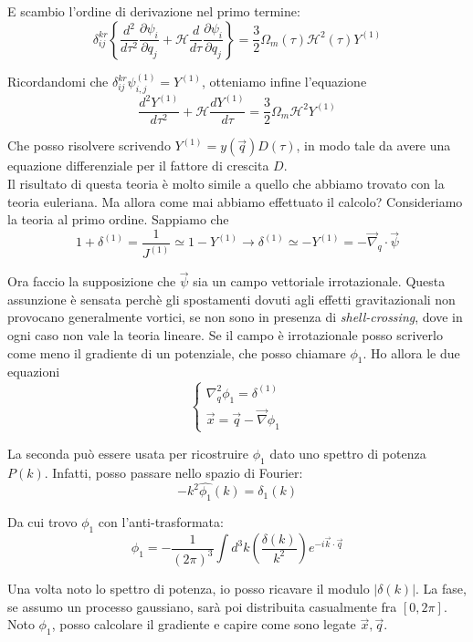 \documentclass{report}
\begin{document}
E scambio l'ordine di derivazione nel primo termine: 
\begin{equation}
    \delta^{kr}_{ij}\left\{\frac{d^2 }{d\tau^2}\frac{\partial \psi_i}{\partial q_j}  + \mathcal{H}\frac{d}{d\tau}\frac{\partial \psi_i}{\partial q_j}\right\} = \frac{3}{2}\Omega_m(\tau)\mathcal{H}^2(\tau)Y^{(1)}
\end{equation}

Ricordandomi che $\delta^{kr}_{ij}\psi^{(1)}_{i,j} = Y^{(1)}$, otteniamo infine l'equazione
\begin{equation}
    \frac{d^2 Y^{(1)}}{d\tau^2} + \mathcal{H}\frac{dY^{(1)}}{d\tau} = \frac{3}{2}\Omega_m \mathcal{H}^2 Y^{(1)}
\end{equation}

Che posso risolvere scrivendo $Y^{(1)} = y(\vec{q})D(\tau)$, in modo tale da avere una equazione differenziale per il fattore di crescita $D$. \\

Il risultato di questa teoria è molto simile a quello che abbiamo trovato con la teoria euleriana. Ma allora come mai abbiamo effettuato il calcolo? Consideriamo la teoria al primo ordine. Sappiamo che 
\begin{equation}
    1 + \delta^{(1)} = \frac{1}{J^{(1)}} \simeq 1 - Y^{(1)} \rightarrow \delta^{(1)} \simeq - Y^{(1)} = - \vec{\nabla}_q \cdot \vec{\psi}
\end{equation}

Ora faccio la supposizione che $\vec{\psi}$ sia un campo vettoriale irrotazionale. Questa assunzione è sensata perchè gli spostamenti dovuti agli effetti gravitazionali non provocano generalmente vortici, se non sono in presenza di \emph{shell-crossing}, dove in ogni caso non vale la teoria lineare. Se il campo è irrotazionale posso scriverlo come meno il gradiente di un potenziale, che posso chiamare $\phi_1$. Ho allora le due equazioni
\[\begin{cases}
    \nabla^2_q \phi_1 = \delta^{(1)} \\ \vec{x} = \vec{q} - \vec{\nabla}\phi_1
\end{cases}\]

La seconda può essere usata per ricostruire $\phi_1$ dato uno spettro di potenza $P(k)$. Infatti, posso passare nello spazio di Fourier: 
\begin{equation}
    -k^2\hat{\phi_1}(k) = \delta_1(k) 
\end{equation}

Da cui trovo $\phi_1$ con l'anti-trasformata: 
\begin{equation}
    \phi_1 = -\frac{1}{(2\pi)^3}\int d^3k \left(\frac{\delta(k)}{k^2}\right)e^{-i\vec{k}\cdot \vec{q}}
\end{equation}

Una volta noto lo spettro di potenza, io posso ricavare il modulo $|\delta(k)|$. La fase, se assumo un processo gaussiano, sarà poi distribuita casualmente fra $[0, 2\pi]$. Noto $\phi_1$, posso calcolare il gradiente e capire come sono legate $\vec{x}, \vec{q}$. 
\end{document}
